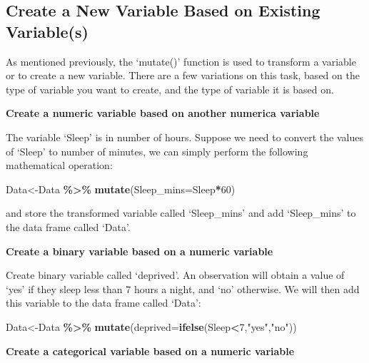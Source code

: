 \documentclass[
  openany]{book}
\newenvironment{Shaded}{\begin{snugshade}}{\end{snugshade}}
\newcommand{\AttributeTok}[1]{\textcolor[rgb]{0.13,0.29,0.53}{#1}}
\newcommand{\DecValTok}[1]{\textcolor[rgb]{0.00,0.00,0.81}{#1}}
\newcommand{\FunctionTok}[1]{\textcolor[rgb]{0.13,0.29,0.53}{\textbf{#1}}}
\newcommand{\NormalTok}[1]{#1}
\newcommand{\OtherTok}[1]{\textcolor[rgb]{0.56,0.35,0.01}{#1}}
\newcommand{\SpecialCharTok}[1]{\textcolor[rgb]{0.81,0.36,0.00}{\textbf{#1}}}
\newcommand{\StringTok}[1]{\textcolor[rgb]{0.31,0.60,0.02}{#1}}
\begin{document}
\subsection{Create a New Variable Based on Existing Variable(s)}\label{create-a-new-variable-based-on-existing-variables}

As mentioned previously, the `mutate()' function is used to transform a variable or to create a new variable. There are a few variations on this task, based on the type of variable you want to create, and the type of variable it is based on.

\textbf{Create a numeric variable based on another numerica variable}

The variable `Sleep' is in number of hours. Suppose we need to convert the values of `Sleep' to number of minutes, we can simply perform the following mathematical operation:

\begin{Shaded}
\begin{Highlighting}[]
\NormalTok{Data}\OtherTok{\textless{}{-}}\NormalTok{Data }\SpecialCharTok{\%\textgreater{}\%} 
  \FunctionTok{mutate}\NormalTok{(}\AttributeTok{Sleep\_mins=}\NormalTok{Sleep}\SpecialCharTok{*}\DecValTok{60}\NormalTok{)}
\end{Highlighting}
\end{Shaded}

and store the transformed variable called `Sleep\_mins' and add `Sleep\_mins' to the data frame called `Data'.

\textbf{Create a binary variable based on a numeric variable}

Create binary variable called `deprived'. An observation will obtain a value of `yes' if they sleep less than 7 hours a night, and `no' otherwise. We will then add this variable to the data frame called `Data':

\begin{Shaded}
\begin{Highlighting}[]
\NormalTok{Data}\OtherTok{\textless{}{-}}\NormalTok{Data }\SpecialCharTok{\%\textgreater{}\%} 
  \FunctionTok{mutate}\NormalTok{(}\AttributeTok{deprived=}\FunctionTok{ifelse}\NormalTok{(Sleep}\SpecialCharTok{\textless{}}\DecValTok{7}\NormalTok{,}\StringTok{"yes"}\NormalTok{,}\StringTok{"no"}\NormalTok{))}
\end{Highlighting}
\end{Shaded}

\textbf{Create a categorical variable based on a numeric variable}
\end{document}
